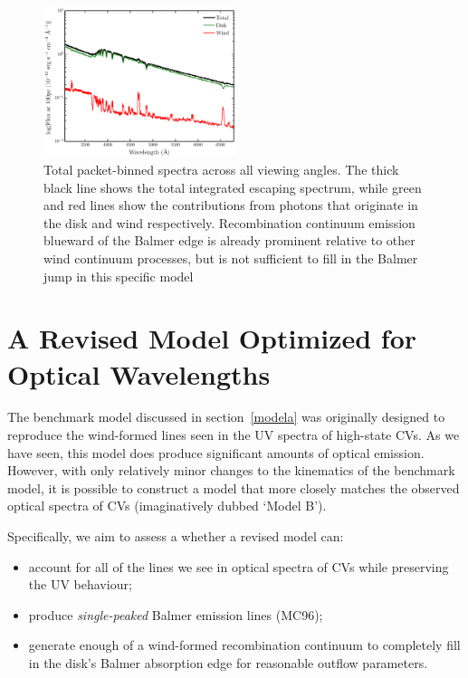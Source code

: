 \documentclass[preprint, a4paper, 11pt]{aastex}
\begin{document}
\begin{figure} 
\includegraphics[width=0.5\textwidth]{figures/modela_escaping.eps}
\caption{Total packet-binned spectra across all viewing angles. 
The thick black line shows the total 
integrated escaping spectrum, while green and red lines show the contributions from photons that originate in the disk and wind respectively. 
Recombination continuum emission blueward of the Balmer 
edge is already prominent relative to other wind continuum processes, but is not sufficient
to fill in the Balmer jump in this specific model}
\label{cont}
\end{figure} 


\newpage








%
%

\section{A Revised Model Optimized for Optical Wavelengths}

The benchmark model discussed in section~\ref{modela} was originally
designed to reproduce the wind-formed lines seen in the UV spectra of
high-state CVs. As we have seen, this model does produce significant
amounts of optical emission. However, with only relatively minor
changes to the kinematics of the benchmark model, it is possible to
construct a model that more closely matches the observed optical
spectra of CVs (imaginatively dubbed `Model B'). 

Specifically, we aim to assess a whether a revised model can:

\begin{itemize}
 	\item account for all of the lines we see in optical spectra of CVs while preserving
the UV behaviour;
 	\item produce {\em single-peaked} Balmer emission lines (MC96); 
 	\item generate enough of a wind-formed recombination continuum 
to completely fill in the disk's Balmer absorption edge for 
reasonable outflow parameters.
\end{itemize} 
\end{document}
